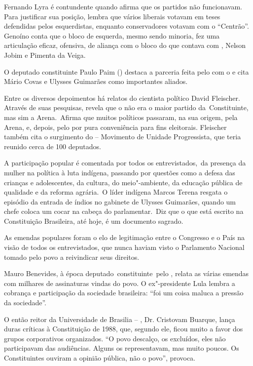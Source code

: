 Fernando Lyra é contundente quando afirma que os partidos não
funcionavam. Para justificar sua posição, lembra que vários liberais
votavam em teses defendidas pelos esquerdistas, enquanto conservadores
votavam com o ``Centrão''. Genoíno conta que o bloco de esquerda, mesmo
sendo minoria, fez uma articulação eficaz, ofensiva, de aliança com o
bloco do  que contava com , Nelson Jobim e Pimenta da Veiga.

O deputado constituinte Paulo Paim () destaca a parceria feita pelo 
com o  e cita Mário Covas e Ulysses Guimarães como importantes
aliados.

Entre os diversos depoimentos há relatos do cientista político David
Fleischer. Através de suas pesquisas, revela que o  não era o maior
partido da~Constituinte, mas sim a Arena.~Afirma que muitos políticos
passaram, na sua origem, pela Arena,  e, depois, pelo  por pura
conveniência para fins eleitorais. Fleischer também cita o surgimento do
 -- Movimento de Unidade Progressista, que teria reunido cerca de 100
deputados.

A participação popular é comentada por todos os entrevistados,~da
presença da mulher na política à luta indígena, passando por questões
como a defesa das crianças e adolescentes, da cultura, do meio"-ambiente,
da educação pública de qualidade e da reforma agrária.~O líder indígena
Marcos Terena resgata o episódio da entrada de índios no gabinete de
Ulysses Guimarães, quando um chefe coloca um cocar na cabeça do
parlamentar.~Diz que o que está escrito na Constituição Brasileira, até
hoje, é um documento sagrado.

As emendas populares foram o elo de legitimação entre o Congresso e o
País na visão de todos os entrevistados, que nunca haviam visto o
Parlamento Nacional tomado pelo povo a reivindicar seus direitos.

Mauro Benevides, à época deputado~constituinte~pelo , relata as
várias emendas com milhares de assinaturas vindas do povo. O
ex"-presidente Lula lembra a cobrança e participação da sociedade
brasileira: ``foi um coisa maluca a pressão da sociedade''.

O então reitor da Universidade de Brasilia -- , Dr. Cristovam
Buarque, lança duras críticas à Constituição de 1988, que, segundo ele,
ficou muito a favor dos grupos corporativos organizados. ``O povo
descalço, os excluídos, eles não participavam das audiências. Alguns os
representavam, mas muito poucos. Os Constituintes ouviram a opinião
pública, não o povo'', provoca.

